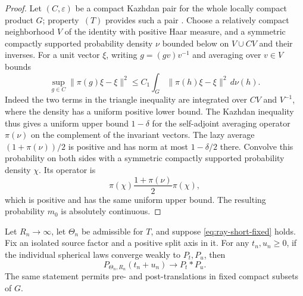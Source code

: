 \begin{proof}
Let \((C,\varepsilon)\) be a compact Kazhdan pair for the whole
locally compact product \(G\); property~\((T)\) provides such a
pair \cite{BHV2008}.  Choose a
relatively compact neighborhood \(V\) of the identity with positive
Haar measure, and a symmetric compactly supported probability
density \(\nu\) bounded below on \(V\cup CV\) and their inverses.
For a unit vector \(\xi\), writing \(g=(gv)v^{-1}\) and averaging
over \(v\in V\) bounds
\[
 \sup_{g\in C}\|\pi(g)\xi-\xi\|^2
 \le C_1\int_G\|\pi(h)\xi-\xi\|^2\,d\nu(h).
\]
Indeed the two terms in the triangle inequality are integrated
over \(CV\) and \(V^{-1}\), where the density has a uniform
positive lower bound.  The Kazhdan inequality thus gives a
uniform upper bound \(1-\delta\) for the self-adjoint averaging
operator \(\pi(\nu)\) on the complement of the invariant vectors.
The lazy average \((1+\pi(\nu))/2\) is positive and has norm at
most \(1-\delta/2\) there.  Convolve this probability on both sides
with a symmetric compactly supported probability density \(\chi\).
Its operator is
\[
 \pi(\chi)\frac{1+\pi(\nu)}2\pi(\chi),
\]
which is positive and has the same uniform upper bound.
The resulting probability \(m_0\) is absolutely continuous.
\end{proof}

\begin{proposition}\label{prop:ray-addition}
Let \(R_n\to\infty\), let \(\Theta_n\) be admissible for \(T\), and suppose
\eqref{eq:ray-short-fixed} holds.  Fix an isolated source
factor and a positive split axis in it.  For any \(t_n,u_n\ge0\),
if the individual spherical laws converge weakly to \(P_t,P_u\),
then
\begin{equation}\label{eq:input-8}
 P_{\Theta_n,R_n}(t_n+u_n)\longrightarrow P_t*P_u .
\end{equation}
The same statement permits pre- and post-translations in fixed
compact subsets of \(G\).
\end{proposition}

